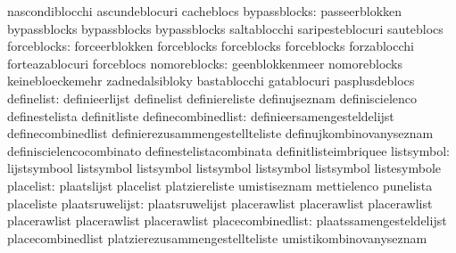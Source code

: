                                   nascondiblocchi                  ascundeblocuri
                                  cacheblocs
                    bypassblocks: passeerblokken                   bypassblocks
                                  bypassblocks                     bypassblocks
                                  saltablocchi                     saripesteblocuri
                                  sauteblocs
                     forceblocks: forceerblokken                   forceblocks
                                  forceblocks                      forceblocks
                                  forzablocchi                     forteazablocuri
                                  forceblocs
                    nomoreblocks: geenblokkenmeer                  nomoreblocks
                                  keinebloeckemehr                 zadnedalsibloky
                                  bastablocchi                     gatablocuri
                                  pasplusdeblocs
                      definelist: definieerlijst                   definelist
                                  definiereliste                   definujseznam
                                  definiscielenco                  definestelista
                                  definitliste
              definecombinedlist: definieersamengesteldelijst      definecombinedlist
                                  definierezusammengestellteliste  definujkombinovanyseznam
                                  definiscielencocombinato         definestelistacombinata
                                  definitlisteimbriquee
                      listsymbol: lijstsymbool                     listsymbol
                                  listsymbol                       listsymbol
                                  listsymbol                       listsymbol
                                  listesymbole
                       placelist: plaatslijst                      placelist
                                  platziereliste                   umistiseznam
                                  mettielenco                      punelista
                                  placeliste
                 plaatsruwelijst: plaatsruwelijst                  placerawlist
                                  placerawlist                     placerawlist
                                  placerawlist                     placerawlist
                                  placerawlist
               placecombinedlist: plaatssamengesteldelijst         placecombinedlist
                                  platzierezusammengestellteliste  umistikombinovanyseznam
